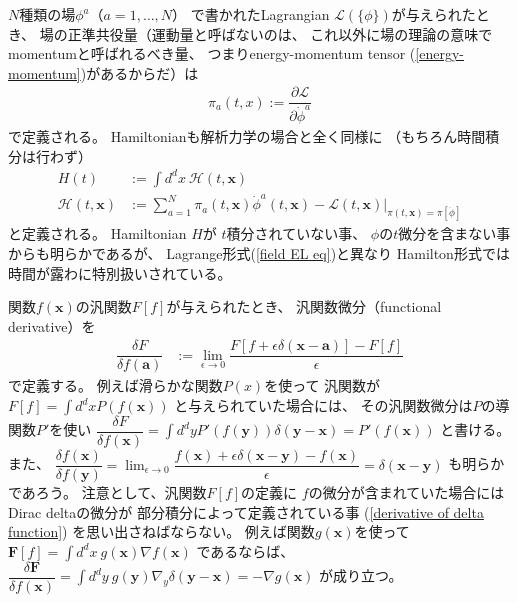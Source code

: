$N$種類の場$\phi^a$（$a = 1, \dots, N$）
で書かれたLagrangian
$\mathcal{L}(\{ \phi \})$が与えられたとき、
場の正準共役量（運動量と呼ばないのは、
これ以外に場の理論の意味でmomentumと呼ばれるべき量、
つまりenergy-momentum tensor (\ref{energy-momentum})があるからだ）は
\begin{align}
    \pi_a (t, x)
    := \dfrac{\partial \mathcal{L}}
        {\partial \dot{\phi}^a}
\end{align}
で定義される。
Hamiltonianも解析力学の場合と全く同様に
（もちろん時間積分は行わず）
\begin{subequations}
\begin{align}
	H (t)
&:=
	\int d^d x\ 
		\mathcal{H} (t, \bm{x})
\\
	\mathcal{H} (t, \bm{x})
&:=
	\sum_{a = 1}^N
		\pi_a (t, \bm{x})
		\dot{\phi}^a (t, \bm{x})
	- \mathcal{L}(t, \bm{x})
	\bigg|_{
		\pi(t, \bm{x})
		= \pi[\dot{\phi}]
	}
\end{align}
\label{field hamiltonian def}
\end{subequations}
と定義される。
Hamiltonian $H$が
$t$積分されていない事、
$\phi$の$t$微分を含まない事からも明らかであるが、
Lagrange形式(\ref{field EL eq})と異なり
Hamilton形式では時間が露わに特別扱いされている。

関数$f(\bm{x})$の汎関数$F[f]$が与えられたとき、
汎関数微分（functional derivative）を
\begin{align}
    \dfrac{ \delta F }
        {\delta f(\bm{a})}
&:=
    \lim_{ \epsilon \to 0 }
    \dfrac{
        F[ f + \epsilon
            \delta(\bm{x} - \bm{a}) ]
    -
        F[ f ]
    }
        {\epsilon}
\end{align}
で定義する。
例えば滑らかな関数$P(x)$を使って
汎関数が
$\displaystyle
F[f] = \int d^d x P(f(\bm{x}))$
と与えられていた場合には、
その汎関数微分は$P$の導関数$P'$を使い
$\displaystyle
    \dfrac{\delta F}{\delta f(\bm{x})}
=
    \int d^d y
    P'( f(\bm{y}) )
    \delta(\bm{y} - \bm{x})
=
    P'( f(\bm{x}) )$
と書ける。
また、
$\displaystyle
\dfrac{\delta f(\bm{x})}
    {\delta f(\bm{y})}
= \lim_{\epsilon \to 0}
\dfrac{
    f(\bm{x})
    + \epsilon \delta(\bm{x} - \bm{y})
    - f(\bm{x})
}{\epsilon}
= \delta(\bm{x} - \bm{y})$
も明らかであろう。
注意として、汎関数$F[f]$の定義に
$f$の微分が含まれていた場合には
Dirac deltaの微分が
部分積分によって定義されている事
(\ref{derivative of delta function})
を思い出さねばならない。
例えば関数$g(\bm{x})$を使って
$\displaystyle
\bm{F}[f] = \int d^d x\ 
    g(\bm{x}) \nabla f(\bm{x})$
であるならば、
$\displaystyle
\dfrac{ \delta \bm{F} }
    {\delta f(\bm{x})}
= \int d^d y\ 
g(\bm{y}) \nabla_y
    \delta(\bm{y} - \bm{x})
= - \nabla g(\bm{x})$
が成り立つ。

